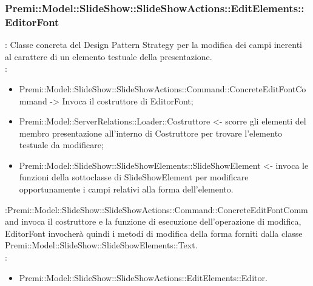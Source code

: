 {                    \subsubsection{Premi::Model::SlideShow::SlideShowActions::EditElements::EditorFont}{
				\textbf{\tipo}: Classe concreta del Design Pattern Strategy per la modifica dei campi inerenti al carattere di un elemento testuale della presentazione.\\	
				\textbf{\relaz}: 
				\begin{itemize}
					\item Premi::Model::SlideShow::SlideShowActions::Command::ConcreteEditFontCommand -> Invoca il costruttore di EditorFont;
                    \item Premi::Model::ServerRelations::Loader::Costruttore <- scorre gli elementi del membro presentazione all'interno di Costruttore per trovare l'elemento testuale da modificare; 
                    \item Premi::Model::SlideShow::SlideShowElements::SlideShowElement <- invoca le funzioni della sottoclasse di SlideShowElement per modificare opportunamente i campi relativi alla forma dell’elemento.
				\end{itemize}	\textbf{\interfacce}:Premi::Model::SlideShow::SlideShowActions::Command::ConcreteEditFontCommand invoca il costruttore e la funzione di esecuzione dell’operazione di modifica, EditorFont invocherà quindi i metodi di modifica della forma forniti dalla classe Premi::Model::SlideShow::SlideShowElements::Text.\\
                \textbf{\base}: 
                    \begin{itemize}
                    \item Premi::Model::SlideShow::SlideShowActions::EditElements::Editor.
                    \end{itemize}
                    }
                }
